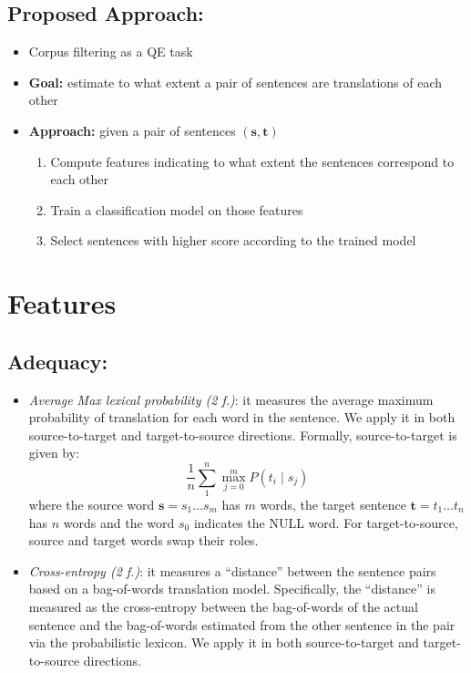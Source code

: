 \documentclass[a0]{sciposter}
\begin{document}
\begin{multicols*}{2}
\subsection*{Proposed Approach:}
\begin{itemize}
  \item Corpus filtering as a QE task
  \item {\bf Goal:} estimate to what extent a pair of sentences are translations of each other
  \item {\bf Approach:} given a pair of sentences $(\mathbf{s}, \mathbf{t})$
  \begin{enumerate}
    \item Compute features indicating to what extent the sentences correspond to each other
    \item Train a classification model on those features
    \item Select sentences with higher score according to the trained model
  \end{enumerate}
\end{itemize}


\section*{\Large Features}
\subsection*{Adequacy:} 
\begin{itemize}
  \item \textit{Average Max lexical probability (2 f.)}: it measures the average maximum probability of translation for each word in the sentence. We apply it in both source-to-target and target-to-source directions. Formally, source-to-target is given by:
  $$ \frac{1}{n}\sum_1^n\max_{j=0}^m P(t_i\mid s_j) $$
  where the source word $\mathbf{s}=s_1\ldots s_m$ has $m$ words, the target sentence $\mathbf{t}=t_1\ldots t_n$ has $n$ words and the word $s_0$ indicates the NULL word. For target-to-source, source and target words swap their roles.
  \item \textit{Cross-entropy (2 f.)}: it measures a ``distance'' between the sentence pairs based on a bag-of-words translation model. Specifically, the ``distance'' is measured as the cross-entropy between the bag-of-words of the actual sentence and the bag-of-words estimated from the other sentence in the pair via the probabilistic lexicon. We apply it in both source-to-target and target-to-source directions.
\end{itemize}


\end{multicols*}
\end{document}
